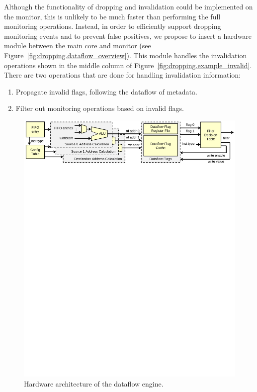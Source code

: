Although the functionality of dropping and invalidation could be implemented on
the monitor, this is unlikely to be much faster than performing the full monitoring
operations.
Instead, in order to efficiently support dropping monitoring events and to prevent false
positives, we propose to insert a hardware module between the main core and
monitor (see Figure~\ref{fig:dropping.dataflow_overview}). 
This module handles the invalidation operations shown in the middle column of
Figure~\ref{fig:dropping.example_invalid}.
There are two operations that are done for handling invalidation information:

\begin{enumerate}
  \item Propagate invalid flags, following the dataflow of metadata.
  \item Filter out monitoring operations based on invalid flags.
\end{enumerate}

\begin{figure}
  \begin{center}
    \includegraphics[]{figs/dataflow_architecture.pdf}
    \vspace{-0.3in}
    \caption{Hardware architecture of the dataflow engine.}
    \label{fig:dropping.dataflow} 
    \vspace{-0.1in}
  \end{center}
\end{figure}

